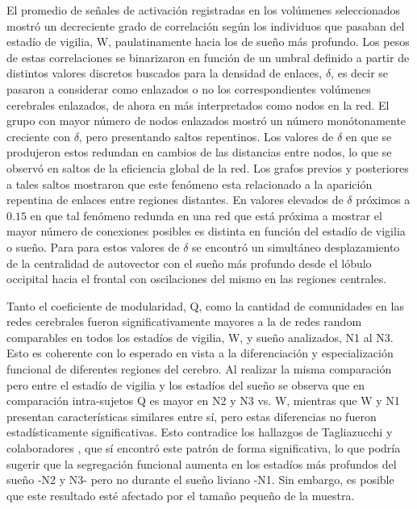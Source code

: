 \documentclass{article}
\begin{document}
El promedio de señales de activación registradas en los volúmenes seleccionados mostró un decreciente grado de correlación según los individuos que pasaban del estadío de vigilia, W, paulatinamente hacia los de sueño más profundo.
Los pesos de estas correlaciones se binarizaron en función de un umbral definido a partir de distintos valores discretos buscados para la densidad de enlaces, $\delta$, es decir se pasaron a considerar como enlazados o no los correspondientes volúmenes cerebrales enlazados, de ahora en más interpretados como nodos en la red.
El grupo con mayor número de nodos enlazados mostró un número monótonamente creciente con $\delta$, pero presentando saltos repentinos.
Los valores de $\delta$ en que se produjeron estos redundan en cambios de las distancias entre nodos, lo que se observó en saltos de la eficiencia global de la red.
Los grafos previos y posteriores a tales saltos mostraron que este fenómeno esta relacionado a la aparición repentina de enlaces entre regiones distantes.
En valores elevados de $\delta$ próximos a $0.15$ en que tal fenómeno redunda en una red que está próxima a mostrar el mayor número de conexiones posibles es distinta en función del estadío de vigilia o sueño.
Para para estos valores de $\delta$ se encontró un simultáneo desplazamiento de la centralidad de autovector con el sueño más profundo desde el lóbulo occipital hacia el frontal con oscilaciones del mismo en las regiones centrales. 

Tanto el coeficiente de modularidad, Q, como la cantidad de comunidades en las redes cerebrales fueron significativamente mayores a la de redes random comparables en todos los estadíos de vigilia, W, y sueño analizados, N1 al N3. Esto es coherente con lo esperado en vista a la diferenciación y especialización funcional de diferentes regiones del cerebro. 
Al realizar la misma comparación pero entre el estadío de vigilia y los estadíos del sueño se observa que en comparación intra-sujetos Q es mayor en N2 y N3 vs. W, mientras que W y N1 presentan características similares entre sí, pero estas diferencias no fueron estadísticamente significativas. Esto contradice los hallazgos de Tagliazucchi y colaboradores \cite{tagliazucchi_large-scale_2013}, que sí encontró este patrón de forma significativa, lo que podría sugerir que la segregación funcional aumenta en los estadíos más profundos del sueño -N2 y N3- pero no durante el sueño liviano -N1. Sin embargo, es posible que este resultado esté afectado por el tamaño pequeño de la muestra.
\end{document}

